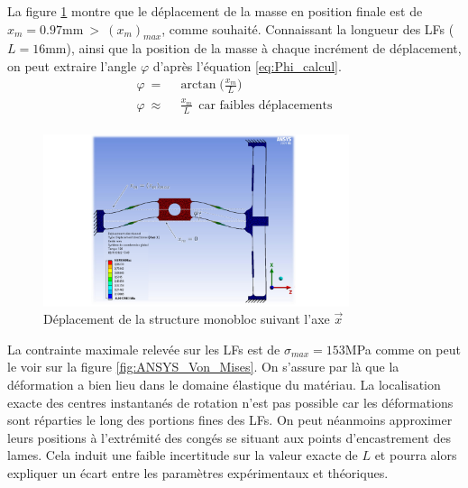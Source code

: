 La figure \ref{fig:ANSYS_deplacement_X} montre que le déplacement de la masse en position finale est de $x_m=0.97$mm$\ >\ (x_m)_{max}$, comme souhaité. Connaissant la longueur des LFs ($L=16$mm), ainsi que la position de la masse à chaque incrément de déplacement, on peut extraire l'angle $\varphi$ d'après l'équation \ref{eq:Phi_calcul}.
\begin{equation}
\begin{split} 
\varphi\ =&\ \arctan {\biggl(\frac{x_m}{L}\biggr)} \\ 
\varphi\ \approx&\ \ \frac{x_m}{L}~~\text{car faibles déplacements} \\
\end{split}
\label{eq:Phi_calcul}
\end{equation}
\begin{figure}[!htbp]
\begin{center}
    \captionsetup{justification=centering}
	\includegraphics[trim={5.5cm 0cm 6cm 0cm},clip, width=0.8\textwidth]{../Chap3/Figure/ANSYS_deplacement_X.pdf}
	\caption{Déplacement de la structure monobloc suivant l'axe $\vec{x}$}
	\label{fig:ANSYS_deplacement_X}
\end{center}
\end{figure}

La contrainte maximale relevée sur les LFs est de ${\sigma}_{max} = 153$MPa comme on peut le voir sur la figure \ref{fig:ANSYS_Von_Mises}. On s'assure par là que la déformation a bien lieu dans le domaine élastique du matériau. La localisation exacte des centres instantanés de rotation n'est pas possible car les déformations sont réparties le long des portions fines des LFs. On peut néanmoins approximer leurs positions à l'extrémité des congés se situant aux points d'encastrement des lames. Cela induit une faible incertitude sur la valeur exacte de $L$ et pourra alors expliquer un écart entre les paramètres expérimentaux et théoriques.
 
